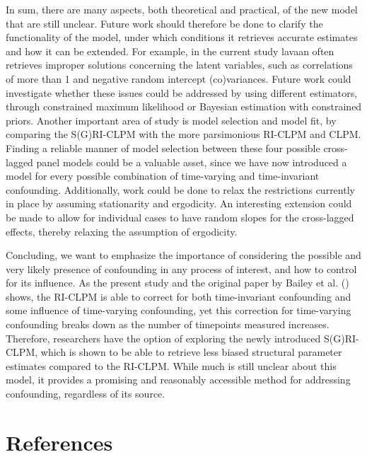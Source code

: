 \documentclass[
  man,
  floatsintext,
  longtable,
  nolmodern,
  notxfonts,
  notimes,
  colorlinks=true,linkcolor=blue,citecolor=blue,urlcolor=blue]{apa7}
\begin{document}
In sum, there are many aspects, both theoretical and practical, of the
new model that are still unclear. Future work should therefore be done
to clarify the functionality of the model, under which conditions it
retrieves accurate estimates and how it can be extended. For example, in
the current study lavaan often retrieves improper solutions concerning
the latent variables, such as correlations of more than 1 and negative
random intercept (co)variances. Future work could investigate whether
these issues could be addressed by using different estimators, through
constrained maximum likelihood or Bayesian estimation with constrained
priors. Another important area of study is model selection and model
fit, by comparing the S(G)RI-CLPM with the more parsimonious RI-CLPM and
CLPM. Finding a reliable manner of model selection between these four
possible cross-lagged panel models could be a valuable asset, since we
have now introduced a model for every possible combination of
time-varying and time-invariant confounding. Additionally, work could be
done to relax the restrictions currently in place by assuming
stationarity and ergodicity. An interesting extension could be made to
allow for individual cases to have random slopes for the cross-lagged
effects, thereby relaxing the assumption of ergodicity.

Concluding, we want to emphasize the importance of considering the
possible and very likely presence of confounding in any process of
interest, and how to control for its influence. As the present study and
the original paper by Bailey et al.
() shows, the RI-CLPM
is able to correct for both time-invariant confounding and some
influence of time-varying confounding, yet this correction for
time-varying confounding breaks down as the number of timepoints
measured increases. Therefore, researchers have the option of exploring
the newly introduced S(G)RI-CLPM, which is shown to be able to retrieve
less biased structural parameter estimates compared to the RI-CLPM.
While much is still unclear about this model, it provides a promising
and reasonably accessible method for addressing confounding, regardless
of its source.

\newpage

\section{References}\label{references}
\end{document}
